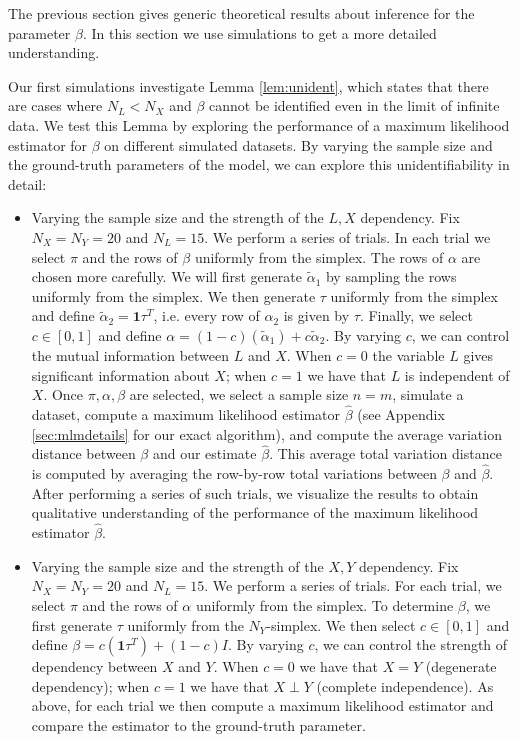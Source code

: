 \documentclass{article}
\theoremstyle{definition}
\begin{document}
The previous section gives generic theoretical results about inference for the parameter $\beta$.  In this section we use simulations to get a more detailed understanding.

Our first simulations investigate Lemma \ref{lem:unident}, which states that there are cases where $N_L<N_X$ and $\beta$ cannot be identified even in the limit of infinite data.  We test this Lemma by exploring the performance of a maximum likelihood estimator for $\beta$ on different simulated datasets.  By varying the sample size and the ground-truth parameters of the model, we can explore this unidentifiability in detail:

\begin{itemize}
    \item Varying the sample size and the strength of the $L,X$ dependency.  Fix $N_X=N_Y=20$ and $N_L=15$.  We perform a series of trials.  In each trial we select $\pi$ and the rows of $\beta$ uniformly from the simplex.  The rows of $\alpha$ are chosen more carefully.  We will first generate $\tilde \alpha_1$ by sampling the rows uniformly from the simplex.  We then generate $\tau$ uniformly from the simplex and define $\tilde \alpha_2 = \mathbf{1}\tau^T$, i.e. every row of $\alpha_2$ is given by $\tau$.  Finally, we select $c\in[0,1]$ and define $\alpha=(1-c)(\tilde \alpha_1)+c\tilde \alpha_2$.  By varying $c$, we can control the mutual information between $L$ and $X$.  When $c=0$ the variable $L$ gives significant information about $X$; when $c=1$ we have that $L$ is independent of $X$.  Once $\pi,\alpha,\beta$ are selected, we select a sample size $n=m$, simulate a dataset, compute a maximum likelihood estimator $\hat \beta $ (see Appendix \ref{sec:mlmdetails} for our exact algorithm), and compute the average variation distance between $\beta$ and our estimate $\hat \beta$.  This average total variation distance is computed by averaging the row-by-row total variations between $\beta$ and  $\hat \beta$.  After performing a series of such trials, we visualize the results to obtain qualitative understanding of the performance of the maximum likelihood estimator $\hat \beta$.

    \item Varying the sample size and the strength of the $X,Y$ dependency.  Fix $N_X=N_Y=20$ and $N_L=15$.  We perform a series of trials.  For each trial, we select $\pi$ and the rows of $\alpha$ uniformly from the simplex.  To determine $\beta$, we first generate $\tau$ uniformly from the $N_Y$-simplex.  We then select $c\in[0,1]$ and define $\beta=c(\mathbf{1}\tau^T)+(1-c)I$.  By varying $c$, we can control the strength of dependency between $X$ and $Y$.  When $c=0$ we have that $X=Y$ (degenerate dependency); when $c=1$ we have that $X\perp Y$ (complete independence).  As above, for each trial we then compute a maximum likelihood estimator and compare the estimator to the ground-truth parameter.   
\end{itemize}
\end{document}
